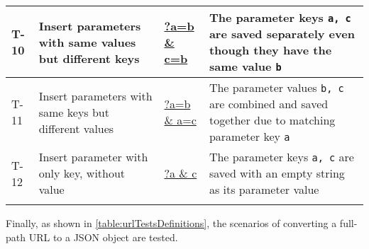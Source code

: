 \begin{tabularx}{\textwidth}{p{} p{} p{} p{}}
  \midrule
  T-10        & Insert parameters with same values but different keys & \url{?a=b          & c=b}                                                                                 & The parameter keys \texttt{a, c} are saved separately even though they have the same value \texttt{b}                                                                                                                                      \\
  \midrule
  T-11        & Insert parameters with same keys but different values & \url{?a=b          & a=c}                                                                                 & The parameter values \texttt{b, c} are combined and saved together due to matching parameter key \texttt{a}                                                                                                                                \\
  \midrule
  T-12        & Insert parameter with only key, without value         & \url{?a            & c}                                                                                   & The parameter keys \texttt{a, c} are saved with an empty string as its parameter value                                                                                                                                                     \\
  \bottomrule
  \label{table:parameterTestsDefinitions}
\end{tabularx}

\noindent Finally, as shown in \autoref{table:urlTestsDefinitions}, the scenarios of converting a full-path URL to a JSON object are tested.

